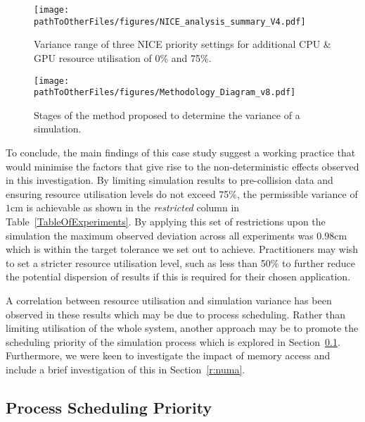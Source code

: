 \begin{figure}[t]
    \centering
    \texttt{[image: \\pathToOtherFiles/figures/NICE\_analysis\_summary\_V4.pdf]}
    \caption{Variance range of three NICE priority settings for additional CPU \& GPU resource utilisation of 0\% and 75\%.}
    \label{NICEExperimentStressSummary}
\end{figure}

\begin{figure*}[t]
    \centering
    \texttt{[image: \\pathToOtherFiles/figures/Methodology\_Diagram\_v8.pdf]}
    \caption{Stages of the method proposed to determine the variance of a simulation.}
    \label{method_diagram}
\end{figure*}

To conclude, the main findings of this case study suggest a working practice that would minimise the factors that give rise to the non-deterministic effects observed in this investigation. By limiting simulation results to pre-collision data and ensuring resource utilisation levels do not exceed 75\%, the permissible variance of $1$cm is achievable as shown in the \textit{restricted} column in Table~\ref{TableOfExperiments}. By applying this set of restrictions upon the simulation the maximum observed deviation across all experiments was $0.98$cm which is within the target tolerance we set out to achieve. 
%
Practitioners may wish to set a stricter resource utilisation level, such as less than 50\% to further reduce the potential dispersion of results if this is required for their chosen application. 

A correlation between resource utilisation and simulation variance has been observed in these results which may be due to process scheduling. Rather than limiting utilisation of the whole system, another approach may be to promote the scheduling priority of the simulation process which is explored in Section~\ref{r:process_scheduling}. Furthermore, we were keen to investigate the impact of memory access and include a brief investigation of this in Section~\ref{r:numa}. 



\DIFaddbegin 

\DIFaddend \subsection{Process Scheduling Priority} \label{r:process_scheduling}



